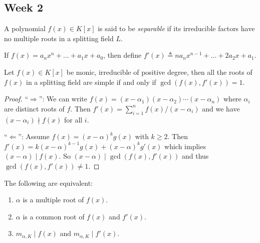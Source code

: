 \subsection{Week 2}

\begin{definition}
  A polynomial $f(x) \in K[x]$ is said to be \emph{separable}
  if its irreducible factors have no multiple roots in a splitting field $L$.
\end{definition}

\begin{definition}
  If $f(x) = a_n x^n + \dots + a_1 x + a_0$, then define $f'(x) \triangleq n a_n x^{n-1} + \dots + 2a_2 x + a_1$.
\end{definition}

\begin{theorem} \label{thm:multiple-root-condition}
  Let $f(x) \in K[x]$ be monic, irreducible of positive degree, then all the roots of $f(x)$
  in a splitting field are simple if and only if $\gcd(f(x), f'(x)) = 1$.

  \begin{proof}
    ``$\Rightarrow$'': We can write $f(x) = (x - \alpha_1) (x - \alpha_2) \dotsm (x - \alpha_n)$ where
    $\alpha_i$ are distinct roots of $f$. Then $f'(x) = \sum_{i = 1}^n f(x) / (x - \alpha_i)$
    and we have $(x - \alpha_i) \nmid f(x)$ for all $i$.

    ``$\Leftarrow$'': Assume $f(x) = (x - \alpha)^k g(x)$ with $k \geq 2$.
    Then $f'(x) = k (x - \alpha)^{k-1} g(x) + (x - \alpha)^k g'(x)$ which implies $(x - \alpha) \mid f(x)$.
    So $(x - \alpha) \mid \gcd(f(x), f'(x))$ and thus $\gcd(f(x), f'(x)) \neq 1$.
  \end{proof}
\end{theorem}

\begin{remark}
  The following are equivalent:
  \begin{enumerate}
    \item $\alpha$ is a multiple root of $f(x)$.
    \item $\alpha$ is a common root of $f(x)$ and $f'(x)$.
    \item $m_{\alpha, K} \mid f(x)$ and $m_{\alpha, K} \mid f'(x)$.
  \end{enumerate}
\end{remark}

